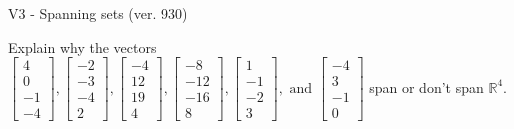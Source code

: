 \begin{exercise}
  \begin{exerciseTitle}V3 - Spanning sets (ver. 930)\end{exerciseTitle}
  \begin{exerciseStatement}
    Explain why the vectors \(\left[\begin{array}{r}
4 \\
0 \\
-1 \\
-4
\end{array}\right] , \left[\begin{array}{r}
-2 \\
-3 \\
-4 \\
2
\end{array}\right] , \left[\begin{array}{r}
-4 \\
12 \\
19 \\
4
\end{array}\right] , \left[\begin{array}{r}
-8 \\
-12 \\
-16 \\
8
\end{array}\right] , \left[\begin{array}{r}
1 \\
-1 \\
-2 \\
3
\end{array}\right] , \text{ and } \left[\begin{array}{r}
-4 \\
3 \\
-1 \\
0
\end{array}\right]\) span or don't span \(\mathbb{R}^4\). 
	



\end{exerciseStatement}
\end{exercise}
